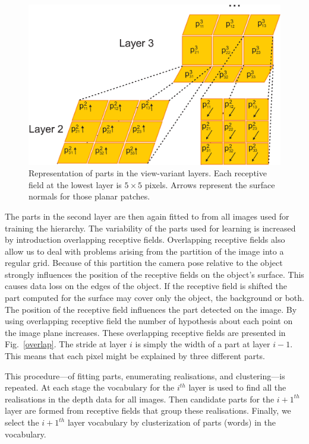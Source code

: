 \documentclass[letterpaper,10pt,conference]{ieeeconf}  %
\begin{document}
\begin{figure}[t]
 \centering
\includegraphics[width=0.9\columnwidth]{../images/word.eps}
\caption{Representation of parts in the view-variant layers. Each receptive field at the lowest layer is $5 \times 5$ pixels. Arrows represent the surface normals for those planar patches.}
 \label{word}
\end{figure}

The parts in the second layer are then again fitted to from all images used for training the hierarchy. The variability of the parts used for learning is increased by introduction overlapping receptive fields. Overlapping receptive fields also allow us to deal with problems arising from the  partition of the image into a regular grid. Because of this partition the camera pose relative to the object strongly influences the position of the receptive fields on the object's surface. This causes data loss on the edges of the object. If the receptive field is shifted the part computed for the surface may cover only the object, the background or both. The position of the receptive field influences the part detected on the image. By using overlapping receptive field the number of hypothesis about each point on the image plane increases. These overlapping receptive fields are presented in Fig.~\ref{overlap}. The stride at layer $i$ is simply the width of a part at layer $i-1$. This means that each pixel might be explained by three different parts. 

This procedure---of fitting parts, enumerating realisations, and clustering---is repeated. At each stage the  vocabulary for the $i^{th}$ layer is used to find all the realisations in the depth data for all images. Then candidate parts for the $i+1^{th}$ layer are formed from receptive fields that group these realisations. Finally, we select the $i+1^{th}$ layer vocabulary by clusterization of parts (words) in the vocabulary. 
\end{document}
